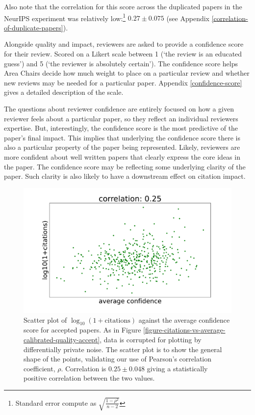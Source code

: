 \documentclass[twoside]{article}
\begin{document}
Also note that the correlation for this score across the duplicated papers in the NeurIPS experiment was relatively low:\footnote{Standard error compute as $\sqrt{\frac{1-\rho^2}{n-2}}$} $0.27 \pm 0.075$ (see Appendix \ref{correlation-of-duplicate-papers}).

Alongside quality and impact, reviewers are asked to provide a confidence score for their review. Scored on a Likert scale between 1 (`the review is an educated guess') and 5 (`the reviewer is absolutely certain'). The confidence score helps Area Chairs decide how much weight to place on a particular review and whether new reviews may be needed for a particular paper. Appendix \ref{confidence-score} gives a detailed description of the scale.  

The questions about reviewer confidence are entirely focused on how a given reviewer feels about a particular paper, so they reflect an individual reviewers expertise. But, interestingly, the confidence score is the most predictive of the paper's final impact. This implies that underlying the confidence score there is also a particular property of the paper being represented. Likely, reviewers are more confident about well written papers that clearly express the core ideas in the paper. The confidence score may be reflecting some underlying clarity of the paper. Such clarity is also likely to have a downstream effect on citation impact.

\begin{figure}[htb]
\includegraphics[width=0.9\columnwidth]{diagrams/neurips/citations-vs-average-confidence-accept.pdf}


\caption{Scatter plot of $\log_{10}(1+\text{citations})$ against the average confidence score for accepted papers. As in Figure \ref{figure-citations-vs-average-calibrated-quality-accept}, data is corrupted for plotting by differentially private noise. The scatter plot is to show the general shape of the points, validating our use of Pearson's correlation coefficient, $\rho$. Correlation is $0.25 \pm 0.048$ giving a statistically positive correlation between the two values.}
\label{figure-citations-vs-average-confidence-accept}
\end{figure}
\end{document}
